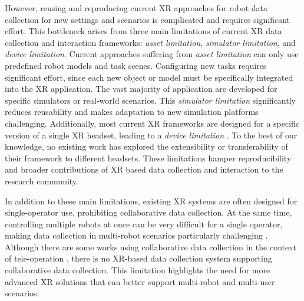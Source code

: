 However, reusing and reproducing current XR approaches for robot data collection for new settings and scenarios is complicated and requires significant effort.
This bottleneck arises from three main limitations of current XR data collection and interaction frameworks: \textit{asset limitation}, \textit{simulator limitation}, and \textit{device limitation}.
Current approaches suffering from \textit{asset limitation} \cite{arclfd, jiang2024comprehensive, arcade, george2025openvr, vicarios}
can only use predefined robot models and task scenes. Configuring new tasks requires significant effort, since each new object or model must be specifically integrated into the XR application.
The vast majority of application are developed for specific simulators or real-world scenarios. This \textit{simulator limitation} \cite{mosbach2022accelerating, lipton2017baxter, dexhub-park, arcade}
significantly reduces reusability and makes adaptation to new simulation platforms challenging.
Additionally, most current XR frameworks are designed for a specific version of a single XR headset, leading to a \textit{device limitation} 
\cite{lipton2017baxter, armada, openteach, meng2023virtual}.
To the best of our knowledge, no existing work has explored the extensibility or transferability of their framework to different headsets.
These limitations hamper reproducibility and broader contributions of XR based data collection and interaction to the research community.

In addition to these main limitations, existing XR systems are often designed for single-operator use, prohibiting collaborative data collection.
At the same time, controlling multiple robots at once can be very difficult for a single operator,
making data collection in multi-robot scenarios particularly challenging \cite{orun2019effect}.
Although there are some works using collaborative data collection in the context of tele-operation \cite{tung2021learning, Qin2023AnyTeleopAG},
there is no XR-based data collection system supporting collaborative data collection.
This limitation highlights the need for more advanced XR solutions that can better support multi-robot and multi-user scenarios.

